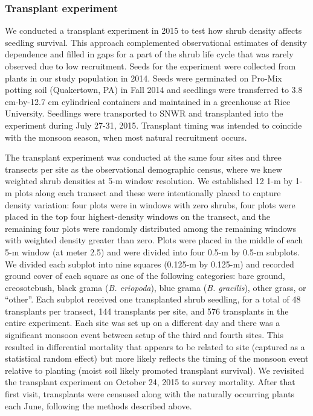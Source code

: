 \documentclass[11pt]{article}\usepackage[]{graphicx}\usepackage[]{color}
\begin{document}
\subsubsection*{Transplant experiment}
We conducted a transplant experiment in 2015 to test how shrub density affects seedling survival. 
This approach complemented observational estimates of density dependence and filled in gaps for a part of the shrub life cycle that was rarely observed due to low recruitment. 
Seeds for the experiment were collected from plants in our study population in 2014.
Seeds were germinated on Pro-Mix potting soil (Quakertown, PA) in Fall 2014 and seedlings were transferred to 3.8 cm-by-12.7 cm cylindrical containers and maintained in a greenhouse at Rice University.
Seedlings were transported to SNWR and transplanted into the experiment during July 27-31, 2015.
Transplant timing was intended to coincide with the monsoon season, when most natural recruitment occurs. 

The transplant experiment was conducted at the same four sites and three transects per site as the observational demographic census, where we knew weighted shrub densities at 5-m window resolution. 
We established 12 1-m by 1-m plots along each transect and these were intentionally placed to capture density variation: four plots were in windows with zero shrubs, four plots were placed in the top four highest-density windows on the transect, and the remaining four plots were randomly distributed among the remaining windows with weighted density greater than zero. 
Plots were placed in the middle of each 5-m window (at meter 2.5) and were divided into four 0.5-m by 0.5-m subplots.
We divided each subplot into nine squares (0.125-m by 0.125-m) and recorded ground cover of each square as one of the following categories: bare ground, creosotebush, black grama (\textit{B. eriopoda}), blue grama (\textit{B. gracilis}), other grass, or ``other''.
Each subplot received one transplanted shrub seedling, for a total of 48 transplants per transect, 144 transplants per site, and 576 transplants in the entire experiment. 
Each site was set up on a different day and there was a significant monsoon event between setup of the third and fourth sites. 
This resulted in differential mortality that appears to be related to site (captured as a statistical random effect) but more likely reflects the timing of the monsoon event relative to planting (moist soil likely promoted transplant survival). 
We revisited the transplant experiment on October 24, 2015 to survey mortality. 
After that first visit, transplants were censused along with the naturally occurring plants each June, following the methods described above. 
\end{document}
